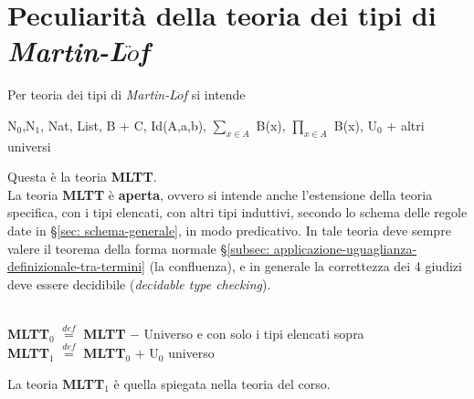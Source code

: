 \section{Peculiarit\`a della teoria dei tipi di \textit{Martin-L$\ddot{o}$f}}
\label{sec:peculiarit\`a-della-teoria-dei-tipi}
Per teoria dei tipi di \textit{Martin-L$\ddot{o}$f} si intende
\begin{center}
N$_0$,N$_1$, Nat, List, B $+$ C, Id(A,a,b), $\sum\limits_{x \in A}$ B(x), $\prod\limits_{x \in A}$ B(x), U$_0$ $+$ altri universi
\end{center}
\noindent
Questa \`e la teoria \textbf{MLTT}.\\
La teoria \textbf{MLTT} \`e \textbf{aperta}, ovvero si intende anche l'estensione della teoria specifica, con i tipi elencati, con altri tipi induttivi, secondo lo schema delle regole date in \S\ref{sec: schema-generale}, in modo predicativo. In tale teoria deve sempre valere il teorema della forma normale \S \ref{subsec: applicazione-uguaglianza-definizionale-tra-termini} (la confluenza), e in generale la correttezza dei 4 giudizi deve essere decidibile (\textit{decidable type checking}).\\\\
\noindent
\begin{center}\textbf{MLTT$_0$} ${\overset{\mathit{def}}{=}}$ \textbf{MLTT} $-$ Universo e con solo i tipi elencati sopra\\
\textbf{MLTT$_1$} ${\overset{\mathit{def}}{=}}$ \textbf{MLTT$_0$} $+$ U$_0$ universo\end{center}
\noindent
La teoria \textbf{MLTT$_1$} \`e quella spiegata nella teoria del corso.

